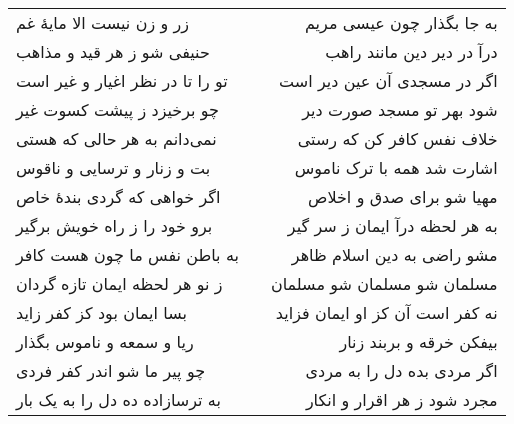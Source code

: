 \begin{center}
\begin{longtable}{l p{0.5cm} r}
زر و زن نیست الا مایهٔ غم
&&
به جا بگذار چون عیسی مریم
\\
حنیفی شو ز هر قید و مذاهب
&&
درآ در دیر دین مانند راهب
\\
تو را تا در نظر اغیار و غیر است
&&
اگر در مسجدی آن عین دیر است
\\
چو برخیزد ز پیشت کسوت غیر
&&
شود بهر تو مسجد صورت دیر
\\
نمی‌دانم به هر حالی که هستی
&&
خلاف نفس کافر کن که رستی
\\
بت و زنار و ترسایی و ناقوس
&&
اشارت شد همه با ترک ناموس
\\
اگر خواهی که گردی بندهٔ خاص
&&
مهیا شو برای صدق و اخلاص
\\
برو خود را ز راه خویش برگیر
&&
به هر لحظه درآ ایمان ز سر گیر
\\
به باطن نفس ما چون هست کافر
&&
مشو راضی به دین اسلام ظاهر
\\
ز نو هر لحظه ایمان تازه گردان
&&
مسلمان شو مسلمان شو مسلمان
\\
بسا ایمان بود کز کفر زاید
&&
نه کفر است آن کز او ایمان فزاید
\\
ریا و سمعه و ناموس بگذار
&&
بیفکن خرقه و بربند زنار
\\
چو پیر ما شو اندر کفر فردی
&&
اگر مردی بده دل را به مردی
\\
به ترسازاده ده دل را به یک بار
&&
مجرد شود ز هر اقرار و انکار
\\
\end{longtable}
\end{center}

